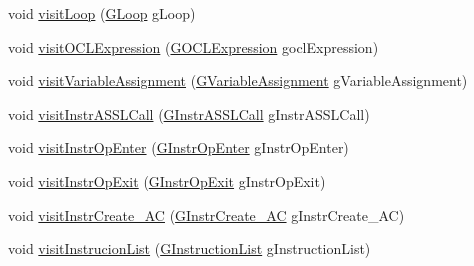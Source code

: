 \begin{DoxyCompactItemize}
\item 
void \hyperlink{classorg_1_1tzi_1_1use_1_1gen_1_1assl_1_1statics_1_1_basic_instruction_coverage_calulator_a490c9a5bee4b66a4caedbdc7d3908606}{visit\-Loop} (\hyperlink{classorg_1_1tzi_1_1use_1_1gen_1_1assl_1_1statics_1_1_g_loop}{G\-Loop} g\-Loop)
\item 
void \hyperlink{classorg_1_1tzi_1_1use_1_1gen_1_1assl_1_1statics_1_1_basic_instruction_coverage_calulator_ab4998881daa16bb7c961d0243342462a}{visit\-O\-C\-L\-Expression} (\hyperlink{classorg_1_1tzi_1_1use_1_1gen_1_1assl_1_1statics_1_1_g_o_c_l_expression}{G\-O\-C\-L\-Expression} gocl\-Expression)
\item 
void \hyperlink{classorg_1_1tzi_1_1use_1_1gen_1_1assl_1_1statics_1_1_basic_instruction_coverage_calulator_aa0d64bd70c8f5d81f3f6c4085a936227}{visit\-Variable\-Assignment} (\hyperlink{classorg_1_1tzi_1_1use_1_1gen_1_1assl_1_1statics_1_1_g_variable_assignment}{G\-Variable\-Assignment} g\-Variable\-Assignment)
\item 
void \hyperlink{classorg_1_1tzi_1_1use_1_1gen_1_1assl_1_1statics_1_1_basic_instruction_coverage_calulator_a2d8a35d86adcd42d835edf84c320bf7f}{visit\-Instr\-A\-S\-S\-L\-Call} (\hyperlink{classorg_1_1tzi_1_1use_1_1gen_1_1assl_1_1statics_1_1_g_instr_a_s_s_l_call}{G\-Instr\-A\-S\-S\-L\-Call} g\-Instr\-A\-S\-S\-L\-Call)
\item 
void \hyperlink{classorg_1_1tzi_1_1use_1_1gen_1_1assl_1_1statics_1_1_basic_instruction_coverage_calulator_abecd1296797b504a3169011546a2abe0}{visit\-Instr\-Op\-Enter} (\hyperlink{classorg_1_1tzi_1_1use_1_1gen_1_1assl_1_1statics_1_1_g_instr_op_enter}{G\-Instr\-Op\-Enter} g\-Instr\-Op\-Enter)
\item 
void \hyperlink{classorg_1_1tzi_1_1use_1_1gen_1_1assl_1_1statics_1_1_basic_instruction_coverage_calulator_a750aa8a9cb61232c95d726d1b3c657e3}{visit\-Instr\-Op\-Exit} (\hyperlink{classorg_1_1tzi_1_1use_1_1gen_1_1assl_1_1statics_1_1_g_instr_op_exit}{G\-Instr\-Op\-Exit} g\-Instr\-Op\-Exit)
\item 
void \hyperlink{classorg_1_1tzi_1_1use_1_1gen_1_1assl_1_1statics_1_1_basic_instruction_coverage_calulator_a1cc3373dba0695bc524a97c5310aa801}{visit\-Instr\-Create\-\_\-\-A\-C} (\hyperlink{classorg_1_1tzi_1_1use_1_1gen_1_1assl_1_1statics_1_1_g_instr_create___a_c}{G\-Instr\-Create\-\_\-\-A\-C} g\-Instr\-Create\-\_\-\-A\-C)
\item 
void \hyperlink{classorg_1_1tzi_1_1use_1_1gen_1_1assl_1_1statics_1_1_basic_instruction_coverage_calulator_af82ffd9ab8be1dabf9ae8ef26ea64e08}{visit\-Instrucion\-List} (\hyperlink{classorg_1_1tzi_1_1use_1_1gen_1_1assl_1_1statics_1_1_g_instruction_list}{G\-Instruction\-List} g\-Instruction\-List)

\end{DoxyCompactItemize}

